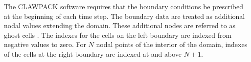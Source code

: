 The CLAWPACK software requires that the boundary conditions be prescribed at the beginning of each time step. The boundary data are treated as additional nodal values extending the domain. These additional nodes are referred to as ghost cells \cite{clawly}. The indexes for the cells on the left boundary are indexed from negative values to zero. For $N$ nodal points of the interior of the domain, indexes of the cells at the right boundary are indexed at and above $N+1$.
